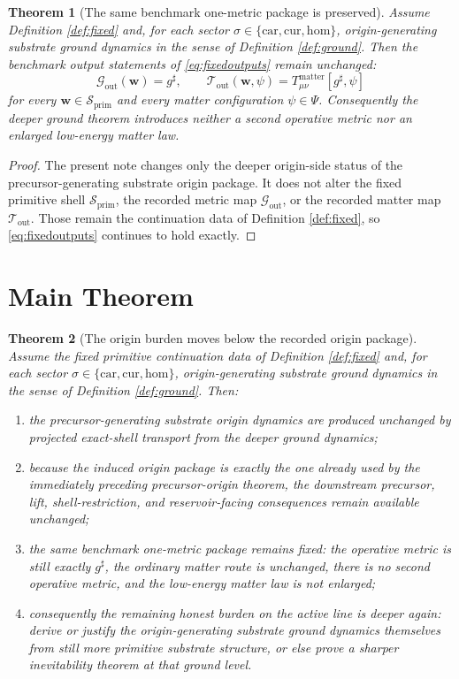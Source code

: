 \documentclass[11pt]{article}
\newcommand{\CompletedMetric}{g^{\sharp}}
\newcommand{\Car}{\mathrm{car}}
\newcommand{\Cur}{\mathrm{cur}}
\newcommand{\Hom}{\mathrm{hom}}
\newcommand{\PrimShell}{\mathcal S_{\mathrm{prim}}}
\newcommand{\MetricOut}{\mathscr G_{\mathrm{out}}}
\newcommand{\MatterOut}{\mathscr T_{\mathrm{out}}}
\newtheorem{theorem}{Theorem}
\begin{document}
\begin{theorem}[The same benchmark one-metric package is preserved]
\label{thm:outputs}
Assume Definition \ref{def:fixed} and, for each sector \(\sigma\in\{\Car,\Cur,\Hom\}\), origin-generating substrate ground dynamics in the sense of Definition \ref{def:ground}. Then the benchmark output statements of \eqref{eq:fixedoutputs} remain unchanged:
\[
\MetricOut(\mathbf w)=\CompletedMetric,
\qquad
\MatterOut(\mathbf w,\psi)
=
T_{\mu\nu}^{\mathrm{matter}}[\CompletedMetric,\psi]
\]
for every \(\mathbf w\in\PrimShell\) and every matter configuration \(\psi\in\Psi\). Consequently the deeper ground theorem introduces neither a second operative metric nor an enlarged low-energy matter law.
\end{theorem}

\begin{proof}
The present note changes only the deeper origin-side status of the precursor-generating substrate origin package. It does not alter the fixed primitive shell \(\PrimShell\), the recorded metric map \(\MetricOut\), or the recorded matter map \(\MatterOut\). Those remain the continuation data of Definition \ref{def:fixed}, so \eqref{eq:fixedoutputs} continues to hold exactly.
\end{proof}

\section{Main Theorem}

\begin{theorem}[The origin burden moves below the recorded origin package]
\label{thm:main}
Assume the fixed primitive continuation data of Definition \ref{def:fixed} and, for each sector \(\sigma\in\{\Car,\Cur,\Hom\}\), origin-generating substrate ground dynamics in the sense of Definition \ref{def:ground}. Then:
\begin{enumerate}
    \item the precursor-generating substrate origin dynamics are produced unchanged by projected exact-shell transport from the deeper ground dynamics;
    \item because the induced origin package is exactly the one already used by the immediately preceding precursor-origin theorem, the downstream precursor, lift, shell-restriction, and reservoir-facing consequences remain available unchanged;
    \item the same benchmark one-metric package remains fixed: the operative metric is still exactly \(\CompletedMetric\), the ordinary matter route is unchanged, there is no second operative metric, and the low-energy matter law is not enlarged;
    \item consequently the remaining honest burden on the active line is deeper again: derive or justify the origin-generating substrate ground dynamics themselves from still more primitive substrate structure, or else prove a sharper inevitability theorem at that ground level.
\end{enumerate}
\end{theorem}
\end{document}
